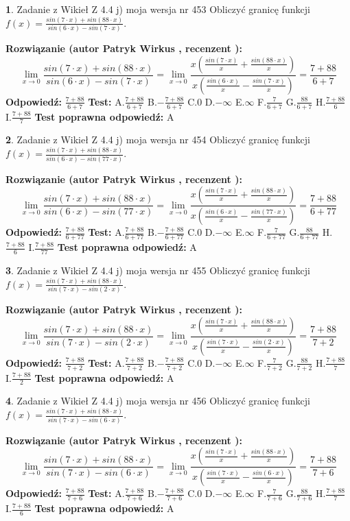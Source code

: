 \documentclass[12pt, a4paper]{article}
\theoremstyle{definition} %
\newtheorem{zad}{}
\newcommand{\zadStart}[1]{\begin{zad}#1\newline}
\newcommand{\zadStop}{\end{zad}}
\newcommand{\rozwStart}[2]{\noindent \textbf{Rozwiązanie (autor #1 , recenzent #2): }\newline}
\newcommand{\rozwStop}{\newline}
\newcommand{\odpStart}{\noindent \textbf{Odpowiedź:}\newline}
\newcommand{\odpStop}{\newline}
\newcommand{\testStart}{\noindent \textbf{Test:}\newline}
\newcommand{\testStop}{\newline}
\newcommand{\kluczStart}{\noindent \textbf{Test poprawna odpowiedź:}\newline}
\newcommand{\kluczStop}{\newline}
\begin{document}
\zadStart{Zadanie z Wikieł Z 4.4 j) moja wersja nr 453}
Obliczyć granicę funkcji $f(x)=\frac{sin(7\cdot x) +sin(88\cdot x)}{sin(6\cdot x) -sin(7\cdot x)}$.
\zadStop
\rozwStart{Patryk Wirkus}{}
$$\lim\limits_{x\to 0}\frac{sin(7\cdot x) +sin(88\cdot x)}{sin(6\cdot x) -sin(7\cdot x)}=\lim\limits_{x\to 0}\frac{x(\frac{sin(7\cdot x)}{x}+\frac{sin(88\cdot x)}{x})}{x(\frac{sin(6\cdot x)}{x}-\frac{sin(7\cdot x)}{x})}=\frac{7+88}{6+7}$$
\rozwStop
\odpStart
$\frac{7+88}{6+7}$
\odpStop
\testStart
A.$\frac{7+88}{6+7}$
B.$-\frac{7+88}{6+7}$
C.$0$
D.$-\infty$
E.$\infty$
F.$\frac{7}{6+7}$
G.$\frac{88}{6+7}$
H.$\frac{7+88}{6}$
I.$\frac{7+88}{7}$
\testStop
\kluczStart
A
\kluczStop



\zadStart{Zadanie z Wikieł Z 4.4 j) moja wersja nr 454}
Obliczyć granicę funkcji $f(x)=\frac{sin(7\cdot x) +sin(88\cdot x)}{sin(6\cdot x) -sin(77\cdot x)}$.
\zadStop
\rozwStart{Patryk Wirkus}{}
$$\lim\limits_{x\to 0}\frac{sin(7\cdot x) +sin(88\cdot x)}{sin(6\cdot x) -sin(77\cdot x)}=\lim\limits_{x\to 0}\frac{x(\frac{sin(7\cdot x)}{x}+\frac{sin(88\cdot x)}{x})}{x(\frac{sin(6\cdot x)}{x}-\frac{sin(77\cdot x)}{x})}=\frac{7+88}{6+77}$$
\rozwStop
\odpStart
$\frac{7+88}{6+77}$
\odpStop
\testStart
A.$\frac{7+88}{6+77}$
B.$-\frac{7+88}{6+77}$
C.$0$
D.$-\infty$
E.$\infty$
F.$\frac{7}{6+77}$
G.$\frac{88}{6+77}$
H.$\frac{7+88}{6}$
I.$\frac{7+88}{77}$
\testStop
\kluczStart
A
\kluczStop



\zadStart{Zadanie z Wikieł Z 4.4 j) moja wersja nr 455}
Obliczyć granicę funkcji $f(x)=\frac{sin(7\cdot x) +sin(88\cdot x)}{sin(7\cdot x) -sin(2\cdot x)}$.
\zadStop
\rozwStart{Patryk Wirkus}{}
$$\lim\limits_{x\to 0}\frac{sin(7\cdot x) +sin(88\cdot x)}{sin(7\cdot x) -sin(2\cdot x)}=\lim\limits_{x\to 0}\frac{x(\frac{sin(7\cdot x)}{x}+\frac{sin(88\cdot x)}{x})}{x(\frac{sin(7\cdot x)}{x}-\frac{sin(2\cdot x)}{x})}=\frac{7+88}{7+2}$$
\rozwStop
\odpStart
$\frac{7+88}{7+2}$
\odpStop
\testStart
A.$\frac{7+88}{7+2}$
B.$-\frac{7+88}{7+2}$
C.$0$
D.$-\infty$
E.$\infty$
F.$\frac{7}{7+2}$
G.$\frac{88}{7+2}$
H.$\frac{7+88}{7}$
I.$\frac{7+88}{2}$
\testStop
\kluczStart
A
\kluczStop



\zadStart{Zadanie z Wikieł Z 4.4 j) moja wersja nr 456}
Obliczyć granicę funkcji $f(x)=\frac{sin(7\cdot x) +sin(88\cdot x)}{sin(7\cdot x) -sin(6\cdot x)}$.
\zadStop
\rozwStart{Patryk Wirkus}{}
$$\lim\limits_{x\to 0}\frac{sin(7\cdot x) +sin(88\cdot x)}{sin(7\cdot x) -sin(6\cdot x)}=\lim\limits_{x\to 0}\frac{x(\frac{sin(7\cdot x)}{x}+\frac{sin(88\cdot x)}{x})}{x(\frac{sin(7\cdot x)}{x}-\frac{sin(6\cdot x)}{x})}=\frac{7+88}{7+6}$$
\rozwStop
\odpStart
$\frac{7+88}{7+6}$
\odpStop
\testStart
A.$\frac{7+88}{7+6}$
B.$-\frac{7+88}{7+6}$
C.$0$
D.$-\infty$
E.$\infty$
F.$\frac{7}{7+6}$
G.$\frac{88}{7+6}$
H.$\frac{7+88}{7}$
I.$\frac{7+88}{6}$
\testStop
\kluczStart
A
\kluczStop
\end{document}
